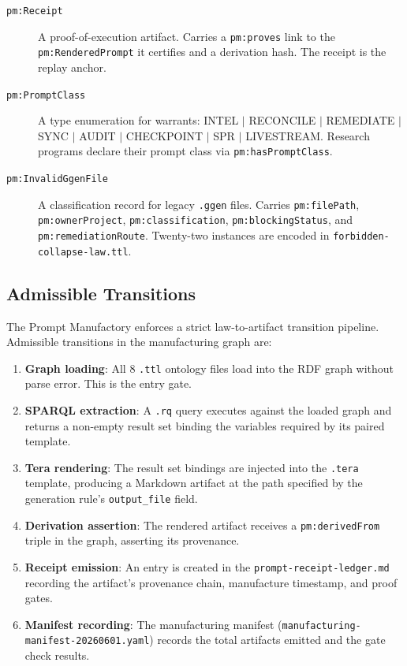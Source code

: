 \begin{description}
  \item[\texttt{pm:Receipt}] A proof-of-execution artifact. Carries a
    \texttt{pm:proves} link to the \texttt{pm:RenderedPrompt} it certifies and a derivation
    hash. The receipt is the replay anchor.

  \item[\texttt{pm:PromptClass}] A type enumeration for warrants:
    INTEL $\mid$ RECONCILE $\mid$ REMEDIATE $\mid$ SYNC $\mid$ AUDIT $\mid$ CHECKPOINT
    $\mid$ SPR $\mid$ LIVESTREAM. Research programs declare their prompt class via
    \texttt{pm:hasPromptClass}.

  \item[\texttt{pm:InvalidGgenFile}] A classification record for legacy \texttt{.ggen}
    files. Carries \texttt{pm:filePath}, \texttt{pm:ownerProject},
    \texttt{pm:classification}, \texttt{pm:blockingStatus}, and
    \texttt{pm:remediationRoute}. Twenty-two instances are encoded in
    \texttt{forbidden-collapse-law.ttl}.
\end{description}

\subsection{Admissible Transitions}
\label{sec:research-prompt-manufactory-architecture-transitions}

The Prompt Manufactory enforces a strict law-to-artifact transition pipeline. Admissible
transitions in the manufacturing graph are:

\begin{enumerate}
  \item \textbf{Graph loading}: All 8 \texttt{.ttl} ontology files load into the RDF graph
    without parse error. This is the entry gate.
  \item \textbf{SPARQL extraction}: A \texttt{.rq} query executes against the loaded graph
    and returns a non-empty result set binding the variables required by its paired template.
  \item \textbf{Tera rendering}: The result set bindings are injected into the \texttt{.tera}
    template, producing a Markdown artifact at the path specified by the generation rule's
    \texttt{output\_file} field.
  \item \textbf{Derivation assertion}: The rendered artifact receives a
    \texttt{pm:derivedFrom} triple in the graph, asserting its provenance.
  \item \textbf{Receipt emission}: An entry is created in the \texttt{prompt-receipt-ledger.md}
    recording the artifact's provenance chain, manufacture timestamp, and proof gates.
  \item \textbf{Manifest recording}: The manufacturing manifest
    (\texttt{manufacturing-manifest-20260601.yaml}) records the total artifacts emitted and
    the gate check results.
\end{enumerate}

